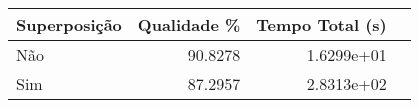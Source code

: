 \begin{tabular}{lrrr}
    \hline
    Superposição & Qualidade \% & Tempo Total (s) \\
    \hline
    Não          & 90.8278      & 1.6299e+01      \\
    Sim          & 87.2957      & 2.8313e+02      \\
    \hline
\end{tabular}